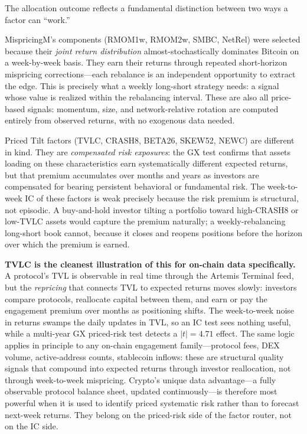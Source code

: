 \documentclass[11pt,a4paper]{article}
\begin{document}
\begin{callout} [title=Why MispricingM dominates and Priced Tilt shrinks]
The allocation outcome reflects a fundamental distinction between two ways a factor can ``work.''

MispricingM's components (RMOM1w, RMOM2w, SMBC, NetRel) were selected because their \emph{joint return distribution} almost-stochastically dominates Bitcoin on a week-by-week basis. They earn their returns through repeated short-horizon mispricing corrections---each rebalance is an independent opportunity to extract the edge. This is precisely what a weekly long-short strategy needs: a signal whose value is realized within the rebalancing interval. These are also all price-based signals: momentum, size, and network-relative rotation are computed entirely from observed returns, with no exogenous data needed.

Priced Tilt factors (TVLC, CRASH8, BETA26, SKEW52, NEWC) are different in kind. They are \emph{compensated risk exposures}: the GX test confirms that assets loading on these characteristics earn systematically different expected returns, but that premium accumulates over months and years as investors are compensated for bearing persistent behavioral or fundamental risk. The week-to-week IC of these factors is weak precisely because the risk premium is structural, not episodic. A buy-and-hold investor tilting a portfolio toward high-CRASH8 or low-TVLC assets would capture the premium naturally; a weekly-rebalancing long-short book cannot, because it closes and reopens positions before the horizon over which the premium is earned.

\textbf{TVLC is the cleanest illustration of this for on-chain data specifically.} A protocol's TVL is observable in real time through the Artemis Terminal feed, but the \emph{repricing} that connects TVL to expected returns moves slowly: investors compare protocols, reallocate capital between them, and earn or pay the engagement premium over months as positioning shifts. The week-to-week noise in returns swamps the daily updates in TVL, so an IC test sees nothing useful, while a multi-year GX priced-risk test detects a $|t|=4.71$ effect. The same logic applies in principle to any on-chain engagement family---protocol fees, DEX volume, active-address counts, stablecoin inflows: these are structural quality signals that compound into expected returns through investor reallocation, not through week-to-week mispricing. Crypto's unique data advantage---a fully observable protocol balance sheet, updated continuously---is therefore most powerful when it is used to identify priced systematic risk rather than to forecast next-week returns. They belong on the priced-risk side of the factor router, not on the IC side.


\end{callout}
\end{document}
